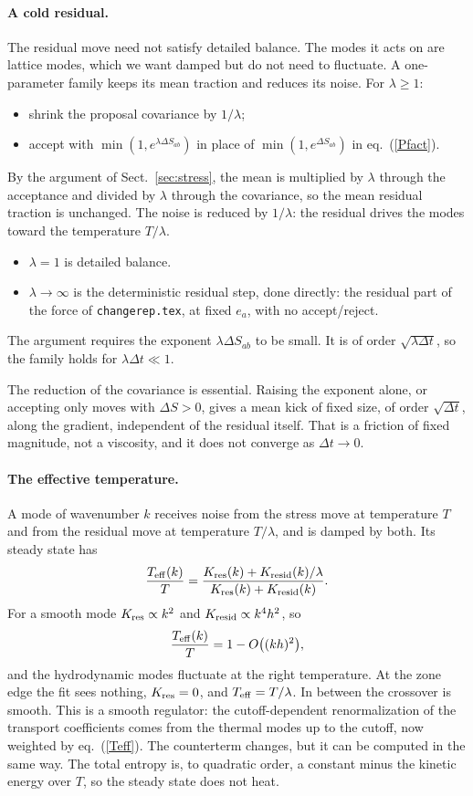 \documentclass[11pt,aps,preprint,nofootinbib,superscriptaddress,tightenlines]{revtex4-2}
\def\st{\begin{equation}}
\def\stp{\end{equation}}
\def\Eq#1{eq.~(\ref{#1})}
\def\Sect#1{Sect.~\ref{#1}}
\let\oldparagraph\paragraph
\renewcommand{\paragraph}{\par\bigskip\oldparagraph}
\begin{document}
\paragraph{A cold residual.}  The residual move need not satisfy detailed
balance.  The modes it acts on are lattice modes, which we want damped but do
not need to fluctuate.  A one-parameter family keeps its mean traction and
reduces its noise.  For $\lambda\geq1$:
\begin{itemize}
\item shrink the proposal covariance by $1/\lambda$;
\item accept with $\min(1,e^{\lambda\Delta S_{ab}})$ in place of
  $\min(1,e^{\Delta S_{ab}})$ in \Eq{Pfact}.
\end{itemize}
By the argument of \Sect{sec:stress}, the mean is multiplied by $\lambda$ through
the acceptance and divided by $\lambda$ through the covariance, so the mean
residual traction is unchanged.  The noise is reduced by $1/\lambda$: the
residual drives the modes toward the temperature $T/\lambda$.
\begin{itemize}
\item $\lambda=1$ is detailed balance.
\item $\lambda\to\infty$ is the deterministic residual step, done directly: the
  residual part of the force of \texttt{changerep.tex}, at fixed $e_a$, with no
  accept/reject.
\end{itemize}
The argument requires the exponent $\lambda\Delta S_{ab}$ to be small.  It is of
order $\sqrt{\lambda\Delta t}$, so the family holds for $\lambda\Delta t\ll1$.

The reduction of the covariance is essential.  Raising the exponent alone, or
accepting only moves with $\Delta S>0$, gives a mean kick of fixed size, of order
$\sqrt{\Delta t}$, along the gradient, independent of the residual itself.
That is a friction of fixed magnitude, not a viscosity, and it does not
converge as $\Delta t\to0$.

\paragraph{The effective temperature.}  A mode of wavenumber $k$ receives noise
from the stress move at temperature $T$ and from the residual move at
temperature $T/\lambda$, and is damped by both.  Its steady state has
\st
\frac{T_{\rm eff}(k)}{T}=\frac{K_{\rm res}(k)+K_{\rm resid}(k)/\lambda}{K_{\rm res}(k)+K_{\rm resid}(k)} .
\label{Teff}
\stp
For a smooth mode $K_{\rm res}\propto k^2$ and $K_{\rm resid}\propto k^4h^2$, so
\st
\frac{T_{\rm eff}(k)}{T}=1-O\big((kh)^2\big) ,
\stp
and the hydrodynamic modes fluctuate at the right temperature.  At the zone
edge the fit sees nothing, $K_{\rm res}=0$, and $T_{\rm eff}=T/\lambda$.  In
between the crossover is smooth.  This is a smooth regulator: the
cutoff-dependent renormalization of the transport coefficients comes from the
thermal modes up to the cutoff, now weighted by \Eq{Teff}.  The counterterm
changes, but it can be computed in the same way.  The total entropy is, to
quadratic order, a constant minus the kinetic energy over $T$, so the steady
state does not heat.
\end{document}
